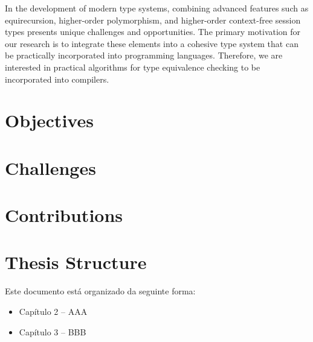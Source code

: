 In the development of modern type systems, combining advanced features such as equirecursion, higher-order polymorphism, and higher-order context-free session types presents unique challenges and opportunities. The primary motivation for our research is to integrate these elements into a cohesive type system that can be practically incorporated into programming languages. Therefore, we are interested in practical algorithms for type equivalence checking to be incorporated into compilers.


\section{Objectives}


\section{Challenges}

\section{Contributions}

\section{Thesis Structure}

Este documento está organizado da seguinte forma:
\begin{itemize}
\item Capítulo 2 – AAA
\item Capítulo 3 – BBB
\end{itemize}

